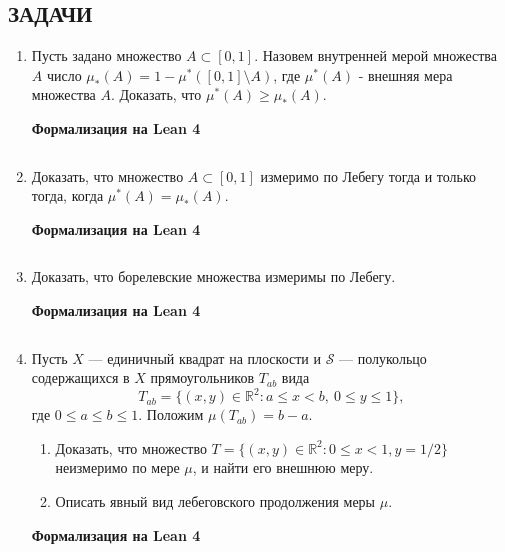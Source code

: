 \documentclass[12pt,a4paper]{article}
\begin{document}
\subsection*{ЗАДАЧИ}
\begin{enumerate}
\newpage
\item Пусть задано множество $A \subset [0,1]$. Назовем внутренней мерой множества $A$ число $\mu_{*}(A) = 1 - \mu^{*}([0,1] \setminus A)$, где $\mu^{*}(A)$ - внешняя мера множества $A$. Доказать, что $\mu^{*}(A) \ge \mu_{*}(A)$.


\begin{center}\small\textbf{Формализация на Lean 4}\end{center}
\inputminted{lean}{FunAn/Section02_Measure/Task01.lean}

\newpage
\item Доказать, что множество $A \subset [0,1]$ измеримо по Лебегу тогда и только тогда, когда $\mu^{*}(A) = \mu_{*}(A)$.


\begin{center}\small\textbf{Формализация на Lean 4}\end{center}
\inputminted{lean}{FunAn/Section02_Measure/Task02.lean}

\newpage
\item Доказать, что борелевские множества измеримы по Лебегу.


\begin{center}\small\textbf{Формализация на Lean 4}\end{center}
\inputminted{lean}{FunAn/Section02_Measure/Task03.lean}

\newpage

\item Пусть $X$ — единичный квадрат на плоскости и $\mathcal{S}$ — полукольцо содержащихся в $X$ прямоугольников $T_{ab}$ вида
$$T_{ab} = \{(x,y) \in \mathbb{R}^{2} : a \le x < b, \ 0 \le y \le 1\},$$
где $0 \le a \le b \le 1$. Положим $\mu(T_{ab}) = b - a$.
\begin{enumerate}[label=\alph*)]
\item Доказать, что множество $T = \{(x,y) \in \mathbb{R}^{2} : 0 \le x < 1, y = 1/2\}$ неизмеримо по мере $\mu$, и найти его внешнюю меру.
\item Описать явный вид лебеговского продолжения меры $\mu$.
\end{enumerate}


\begin{center}\small\textbf{Формализация на Lean 4}\end{center}
\inputminted{lean}{FunAn/Section02_Measure/Task04.lean}


\end{enumerate}
\end{document}
